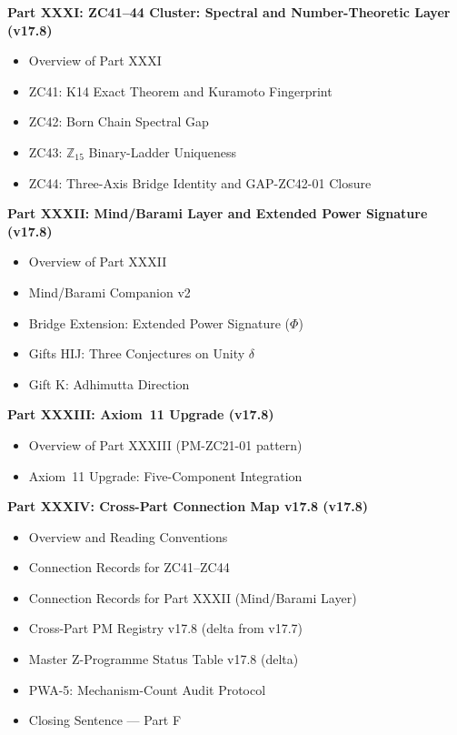 \documentclass[11pt, a4paper]{article}
\begin{document}
\begin{contentsbox}[title={Part F --- Part and Section Headers}]
\textbf{Part XXXI: ZC41--44 Cluster: Spectral and
  Number-Theoretic Layer (v17.8)}
\begin{itemize}[noitemsep,leftmargin=1.5em]
  \item Overview of Part XXXI
  \item ZC41: K14 Exact Theorem and Kuramoto Fingerprint
  \item ZC42: Born Chain Spectral Gap
  \item ZC43: $\mathbb{Z}_{15}$ Binary-Ladder Uniqueness
  \item ZC44: Three-Axis Bridge Identity and GAP-ZC42-01 Closure
\end{itemize}

\textbf{Part XXXII: Mind/Barami Layer and Extended Power Signature
  (v17.8)}
\begin{itemize}[noitemsep,leftmargin=1.5em]
  \item Overview of Part XXXII
  \item Mind/Barami Companion v2
  \item Bridge Extension: Extended Power Signature ($\Phi$)
  \item Gifts HIJ: Three Conjectures on Unity $\delta$
  \item Gift K: Adhimutta Direction
\end{itemize}

\textbf{Part XXXIII: Axiom~11 Upgrade (v17.8)}
\begin{itemize}[noitemsep,leftmargin=1.5em]
  \item Overview of Part XXXIII (PM-ZC21-01 pattern)
  \item Axiom~11 Upgrade: Five-Component Integration
\end{itemize}

\textbf{Part XXXIV: Cross-Part Connection Map v17.8 (v17.8)}
\begin{itemize}[noitemsep,leftmargin=1.5em]
  \item Overview and Reading Conventions
  \item Connection Records for ZC41--ZC44
  \item Connection Records for Part XXXII (Mind/Barami Layer)
  \item Cross-Part PM Registry v17.8 (delta from v17.7)
  \item Master Z-Programme Status Table v17.8 (delta)
  \item PWA-5: Mechanism-Count Audit Protocol
  \item Closing Sentence --- Part F
\end{itemize}
\end{contentsbox}
\end{document}
